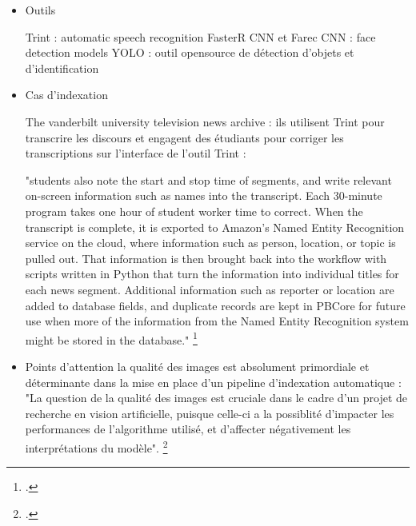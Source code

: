 \begin{itemize}
Implémentation d'une combinaison d'outils différents pour l'indexation : 
"La combinaison de différents outils et leur intégration dans des environnementslogiciels existants est un sujet important, pour lequel il existe désormais un large éventail de solutions, souvent open source"
\footcite{zotero-item-584}

\item Outils

Trint : automatic speech recognition 
FasterR CNN et Farec CNN : face detection models 
YOLO : outil opensource de détection d'objets et d'identification

\item Cas d'indexation

The vanderbilt university television news archive : ils utilisent Trint pour transcrire les discours et engagent des étudiants pour corriger les transcriptions sur l'interface de l'outil Trint : 

"students also note the start and stop time of segments, and write relevant on-screen information such as names into the transcript. Each 30-minute program takes one hour of student worker time to correct. When the transcript is complete, it is exported to Amazon’s Named Entity Recognition service on the cloud, where information such as person, location, or topic is pulled out. That information is then brought back into the workflow with scripts written in Python that turn the information into individual titles for each news segment. Additional information such as reporter or location are added to database fields, and duplicate records are kept in PBCore for future use when more of the information from the Named Entity Recognition system might be stored in the database."
\footcite{2021b}


\item Points d'attention
la qualité des images est absolument primordiale et déterminante dans la mise en place d'un pipeline d'indexation automatique : "La question de la qualité des images est
cruciale dans le cadre d’un projet de recherche en vision artificielle, puisque celle-ci a la possiblité d’impacter les performances de l’algorithme utilisé, et d’affecter négativement les interprétations du modèle". \footcite{norindr2023}



\end{itemize}